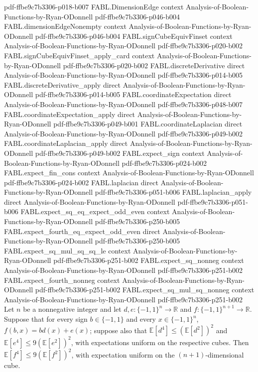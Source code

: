 \begin{theorem}
  {pdf-ffbe9c7b3306-p018-b007}
\proofstep
  {FABL.DimensionEdge}
  {context}
  {Analysis-of-Boolean-Functions-by-Ryan-ODonnell}
  {pdf-ffbe9c7b3306-p046-b004}
\proofstep
  {FABL.dimensionEdgeNonempty}
  {context}
  {Analysis-of-Boolean-Functions-by-Ryan-ODonnell}
  {pdf-ffbe9c7b3306-p046-b004}
\proofstep
  {FABL.signCubeEquivFinset}
  {context}
  {Analysis-of-Boolean-Functions-by-Ryan-ODonnell}
  {pdf-ffbe9c7b3306-p020-b002}
\proofstep
  {FABL.signCubeEquivFinset_apply_card}
  {context}
  {Analysis-of-Boolean-Functions-by-Ryan-ODonnell}
  {pdf-ffbe9c7b3306-p020-b002}
\proofstep
  {FABL.discreteDerivative}
  {direct}
  {Analysis-of-Boolean-Functions-by-Ryan-ODonnell}
  {pdf-ffbe9c7b3306-p014-b005}
\proofstep
  {FABL.discreteDerivative_apply}
  {direct}
  {Analysis-of-Boolean-Functions-by-Ryan-ODonnell}
  {pdf-ffbe9c7b3306-p014-b005}
\proofstep
  {FABL.coordinateExpectation}
  {direct}
  {Analysis-of-Boolean-Functions-by-Ryan-ODonnell}
  {pdf-ffbe9c7b3306-p048-b007}
\proofstep
  {FABL.coordinateExpectation_apply}
  {direct}
  {Analysis-of-Boolean-Functions-by-Ryan-ODonnell}
  {pdf-ffbe9c7b3306-p049-b001}
\proofstep
  {FABL.coordinateLaplacian}
  {direct}
  {Analysis-of-Boolean-Functions-by-Ryan-ODonnell}
  {pdf-ffbe9c7b3306-p049-b002}
\proofstep
  {FABL.coordinateLaplacian_apply}
  {direct}
  {Analysis-of-Boolean-Functions-by-Ryan-ODonnell}
  {pdf-ffbe9c7b3306-p049-b002}
\proofstep
  {FABL.expect_sign}
  {context}
  {Analysis-of-Boolean-Functions-by-Ryan-ODonnell}
  {pdf-ffbe9c7b3306-p024-b002}
\proofstep
  {FABL.expect_fin_cons}
  {context}
  {Analysis-of-Boolean-Functions-by-Ryan-ODonnell}
  {pdf-ffbe9c7b3306-p024-b002}
\proofstep
  {FABL.laplacian}
  {direct}
  {Analysis-of-Boolean-Functions-by-Ryan-ODonnell}
  {pdf-ffbe9c7b3306-p051-b006}
\proofstep
  {FABL.laplacian_apply}
  {direct}
  {Analysis-of-Boolean-Functions-by-Ryan-ODonnell}
  {pdf-ffbe9c7b3306-p051-b006}
\proofstep
  {FABL.expect_sq_eq_expect_odd_even}
  {context}
  {Analysis-of-Boolean-Functions-by-Ryan-ODonnell}
  {pdf-ffbe9c7b3306-p250-b005}
\proofstep
  {FABL.expect_fourth_eq_expect_odd_even}
  {direct}
  {Analysis-of-Boolean-Functions-by-Ryan-ODonnell}
  {pdf-ffbe9c7b3306-p250-b005}
\proofstep
  {FABL.expect_sq_mul_sq_sq_le}
  {context}
  {Analysis-of-Boolean-Functions-by-Ryan-ODonnell}
  {pdf-ffbe9c7b3306-p251-b002}
\proofstep
  {FABL.expect_sq_nonneg}
  {context}
  {Analysis-of-Boolean-Functions-by-Ryan-ODonnell}
  {pdf-ffbe9c7b3306-p251-b002}
\proofstep
  {FABL.expect_fourth_nonneg}
  {context}
  {Analysis-of-Boolean-Functions-by-Ryan-ODonnell}
  {pdf-ffbe9c7b3306-p251-b002}
\proofstep
  {FABL.expect_sq_mul_sq_nonneg}
  {context}
  {Analysis-of-Boolean-Functions-by-Ryan-ODonnell}
  {pdf-ffbe9c7b3306-p251-b002}
Let $n$ be a nonnegative integer and let $d,e:\{-1,1\}^n\to\mathbb R$ and
$f:\{-1,1\}^{n+1}\to\mathbb R$. Suppose that for every sign $b\in\{-1,1\}$ and every
$x\in\{-1,1\}^n$, $f(b,x)=bd(x)+e(x)$; suppose also that $\mathbb E[d^4]\le(\mathbb
E[d^2])^2$ and $\mathbb E[e^4]\le9(\mathbb E[e^2])^2$, with expectations uniform on the
respective cubes. Then $\mathbb E[f^4]\le9(\mathbb E[f^2])^2$, with expectation uniform
on the $(n+1)$-dimensional cube.
\end{theorem}

